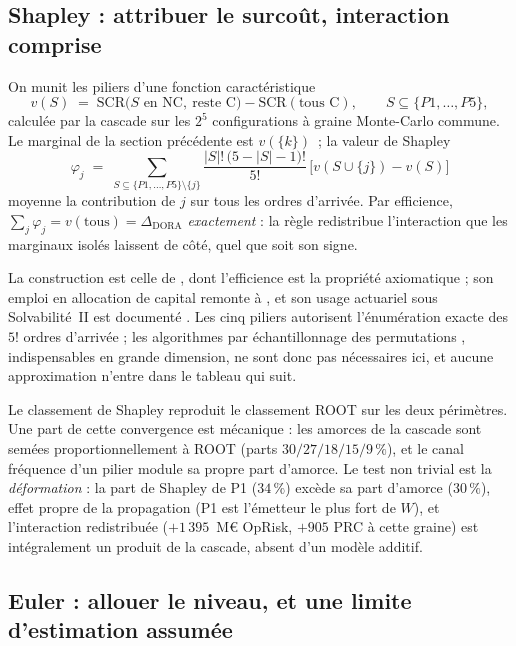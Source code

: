 \subsection{Shapley : attribuer le surcoût, interaction comprise}

On munit les piliers d'une fonction caractéristique
\[
v(S) \;=\; \mathrm{SCR}\bigl(S \text{ en NC},\ \text{reste C}\bigr)-\mathrm{SCR}(\text{tous C}),
\qquad S \subseteq \{P1,\dots,P5\},
\]
calculée par la cascade sur les $2^5$ configurations à graine Monte-Carlo commune. Le
marginal de la section précédente est $v(\{k\})$~; la valeur de Shapley
\[
\varphi_j \;=\; \sum_{S \subseteq \{P1,\dots,P5\}\setminus\{j\}}
\frac{|S|!\,\bigl(5-|S|-1\bigr)!}{5!}\,\bigl[v(S\cup\{j\})-v(S)\bigr]
\]
moyenne la contribution de $j$ sur tous les ordres d'arrivée. Par efficience,
$\sum_j \varphi_j = v(\text{tous}) = \Delta_{\text{DORA}}$ \emph{exactement} : la règle
redistribue l'interaction que les marginaux isolés laissent de côté, quel que soit son signe.

La construction est celle de \citet{Shapley1953}, dont l'efficience est la propriété
axiomatique ; son emploi en allocation de capital remonte à \citet{denault2001}, et son usage
actuariel sous Solvabilité~II est documenté \citep{Decupere2011}. Les cinq piliers autorisent l'énumération exacte des $5!$
ordres d'arrivée ; les algorithmes par échantillonnage des permutations
\citep{CastroGomezTejada2009, SongNelsonStaum2016}, indispensables en grande dimension, ne
sont donc pas nécessaires ici, et aucune approximation n'entre dans le tableau qui suit.

Le classement de Shapley reproduit le classement ROOT sur les deux périmètres. Une part de
cette convergence est mécanique : les amorces de la cascade sont semées
proportionnellement à ROOT (parts $30/27/18/15/9\,\%$),
et le canal fréquence d'un pilier
module sa propre part d'amorce. Le test non trivial est la \emph{déformation} : la part de
Shapley de P1 ($34\,\%$) excède sa part d'amorce ($30\,\%$), effet propre de la propagation
(P1 est l'émetteur le plus fort de $W$), et l'interaction redistribuée ($+1\,395$~M\euro{}
OpRisk, $+905$ PRC à cette graine) est intégralement un produit de la cascade, absent d'un
modèle additif.

\subsection{Euler : allouer le niveau, et une limite d'estimation assumée}

